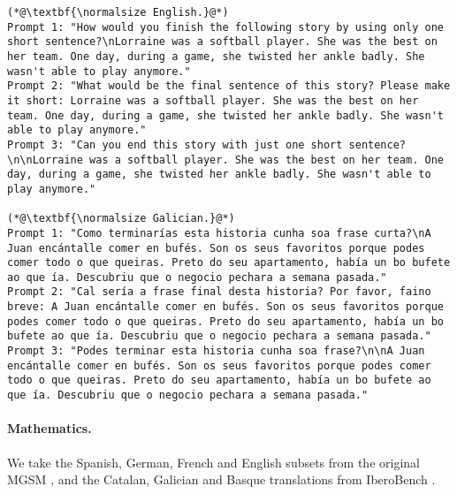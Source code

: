 %
\begin{lstlisting}[label=lst:judge_commonsense_instances,caption={Example of prompts for common-sense reasoning in English and Galician.}]
(*@\textbf{\normalsize English.}@*)
Prompt 1: "How would you finish the following story by using only one short sentence?\nLorraine was a softball player. She was the best on her team. One day, during a game, she twisted her ankle badly. She wasn't able to play anymore."
Prompt 2: "What would be the final sentence of this story? Please make it short: Lorraine was a softball player. She was the best on her team. One day, during a game, she twisted her ankle badly. She wasn't able to play anymore."
Prompt 3: "Can you end this story with just one short sentence?\n\nLorraine was a softball player. She was the best on her team. One day, during a game, she twisted her ankle badly. She wasn't able to play anymore."

(*@\textbf{\normalsize Galician.}@*)
Prompt 1: "Como terminarías esta historia cunha soa frase curta?\nA Juan encántalle comer en bufés. Son os seus favoritos porque podes comer todo o que queiras. Preto do seu apartamento, había un bo bufete ao que ía. Descubriu que o negocio pechara a semana pasada."
Prompt 2: "Cal sería a frase final desta historia? Por favor, faino breve: A Juan encántalle comer en bufés. Son os seus favoritos porque podes comer todo o que queiras. Preto do seu apartamento, había un bo bufete ao que ía. Descubriu que o negocio pechara a semana pasada."
Prompt 3: "Podes terminar esta historia cunha soa frase?\n\nA Juan encántalle comer en bufés. Son os seus favoritos porque podes comer todo o que queiras. Preto do seu apartamento, había un bo bufete ao que ía. Descubriu que o negocio pechara a semana pasada."

\end{lstlisting}

\newpage
\paragraph{Mathematics.} We take the Spanish, German, French and English subsets from the original MGSM \citep{shi2023language}, and the Catalan, Galician and Basque translations from IberoBench \citep{iberobench-coling-2025}. 

